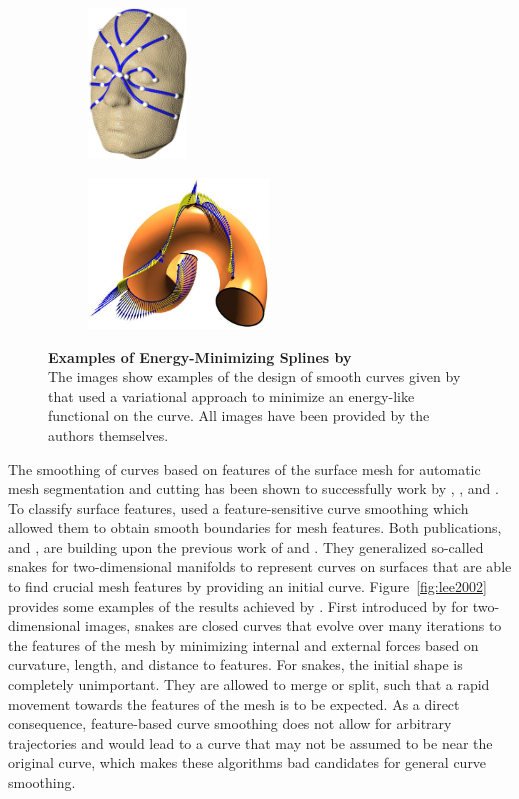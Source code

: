 \documentclass{stdlocal}
\begin{document}
\begin{figure}[t]
  \centering
  \begin{subfigure}[b]{0.39\linewidth}
    \centering
    \includegraphics[height=4cm]{images/hofer2004-1.png}
  \end{subfigure}
  \begin{subfigure}[b]{0.59\linewidth}
    \centering
    \includegraphics[height=4cm]{images/hofer2004-2.png}
  \end{subfigure}
  \caption[Examples of Energy-Minimizing Splines by \textcite{hofer2004}]{%
    \textbf{Examples of Energy-Minimizing Splines by \textcite{hofer2004}}\\
    The images show examples of the design of smooth curves given by \textcite{hofer2004} that used a variational approach to minimize an energy-like functional on the curve.
    All images have been provided by the authors themselves.
  }
  \label{fig:hofer2004}
\end{figure}

The smoothing of curves based on features of the surface mesh for automatic mesh segmentation and cutting has been shown to successfully work by \textcite{jung2004}, \textcite{bischoff2005}, and \textcite{lai2007}.
To classify surface features, \textcite{lai2007} used a feature-sensitive curve smoothing which allowed them to obtain smooth boundaries for mesh features.
Both publications, \textcite{jung2004} and \textcite{bischoff2005}, are building upon the previous work of \textcite{lee2002} and \textcite{lee2004}.
They generalized so-called snakes for two-dimensional manifolds to represent curves on surfaces that are able to find crucial mesh features by providing an initial curve.
Figure~\ref{fig:lee2002} provides some examples of the results achieved by \textcite{lee2002}.
First introduced by \textcite{kass1988} for two-dimensional images, snakes are closed curves that evolve over many iterations to the features of the mesh by minimizing internal and external forces based on curvature, length, and distance to features.
For snakes, the initial shape is completely unimportant.
They are allowed to merge or split, such that a rapid movement towards the features of the mesh is to be expected.
As a direct consequence, feature-based curve smoothing does not allow for arbitrary trajectories and would lead to a curve that may not be assumed to be near the original curve, which makes these algorithms bad candidates for general curve smoothing.
\end{document}
